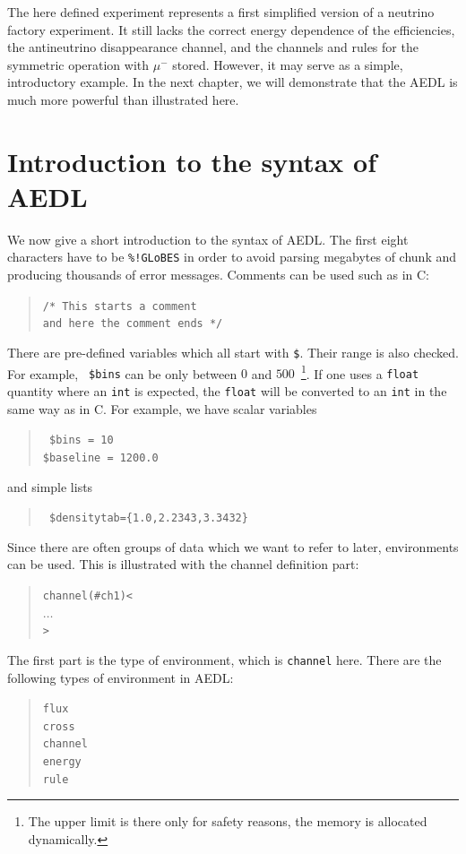The here defined experiment represents a first simplified version of a neutrino factory experiment. It still lacks the correct energy dependence of the efficiencies, the antineutrino disappearance channel, and the channels and rules for the symmetric operation with $\mu^-$ stored. However, it may serve as a simple, introductory example. In the next chapter, we will demonstrate that the AEDL is much more powerful than illustrated here.


\section{Introduction to the syntax of AEDL}
\label{sec:syntax}

We now give a short introduction to the syntax of AEDL.
 The first eight characters have to be {\tt \%!GLoBES}
in order to avoid parsing megabytes of chunk
 and producing thousands of error messages. 
%
Comments can be used such as in C:
\begin{quote}
{\tt /* This starts a comment\\
 and here the comment ends */
}
\end{quote}
There are pre-defined variables which all start with {\tt \$}. Their range
is also checked. For example,  {\tt 
\$bins} can be only between $0$ and $500$~\footnote{The upper limit is 
there only for safety reasons, the memory is allocated dynamically.}. If one uses a {\tt float} quantity where  an {\tt int} is expected, the {\tt float} will be converted to an {\tt int} in the same way as in C.  For example, we have scalar variables
\begin{quote}
{\tt
\$bins = 10\\
\$baseline = 1200.0
}
\end{quote}
and simple lists
\begin{quote}
{\tt
\$densitytab=\{1.0,2.2343,3.3432\} 
}
\end{quote}
%
Since there are often groups of data which we want to refer to later,
environments can be used. This is illustrated 
with the channel definition part:
\begin{quote}
{\tt channel(\#ch1)<\\
\tb  $\ldots$\\
>
}
\end{quote}
The first part is the type of environment, which is {\tt channel} here. 
There are the following types of environment in AEDL:
\begin{quote}
{\tt flux\\
cross\\
channel\\
energy\\
rule
}
\end{quote}
